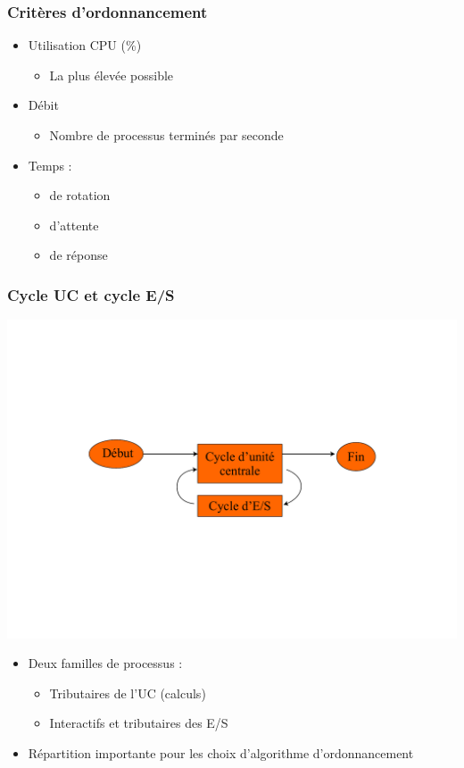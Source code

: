 \begin{frame}
 \frametitle{Critères d’ordonnancement}
 \begin{itemize}
 \item Utilisation CPU (\%)
 \begin{itemize}
 \item La plus élevée possible
 \end{itemize}
 \item Débit
 \begin{itemize}
 \item Nombre de processus terminés par seconde
 \end{itemize}
 \item Temps :
\begin{itemize}
\item de rotation
\item d’attente
\item de réponse
\end{itemize}

\end{itemize}
\end{frame}

\begin{frame}
 \frametitle{Cycle UC et cycle E/S}
 \includegraphics[width=.9\textwidth]{../illustration/cycle_es_uc.pdf}
 \begin{itemize}
 \item Deux familles de processus :
 \begin{itemize}
 \item Tributaires de l’UC (calculs)
 \item Interactifs et tributaires des E/S
 \end{itemize}
 \item Répartition importante pour les choix d’algorithme d’ordonnancement
 \end{itemize}
\end{frame}



